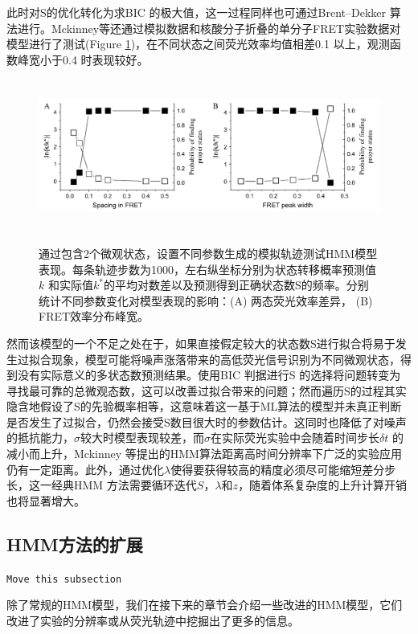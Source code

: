 \documentclass[11pt, a4paper]{article}
\begin{document}
此时对S的优化转化为求BIC 的极大值，这一过程同样也可通过Brent–Dekker 算法进行。Mckinney等还通过模拟数据和核酸分子折叠的单分子FRET实验数据对模型进行了测试(Figure \ref{fig:test})，在不同状态之间荧光效率均值相差0.1 以上，观测函数峰宽小于0.4 时表现较好。

\begin{figure}[htb]
  \centering
  \includegraphics[height=5cm]{Fig_test.PNG}\\
  \caption{通过包含2个微观状态，设置不同参数生成的模拟轨迹测试HMM模型表现。每条轨迹步数为1000，左右纵坐标分别为状态转移概率预测值$k$ 和实际值$k^*$的平均对数差以及预测得到正确状态数S的频率。分别统计不同参数变化对模型表现的影响：(A) 两态荧光效率差异， (B) FRET效率分布峰宽。}%
  \label{fig:test}
\end{figure}

然而该模型的一个不足之处在于，如果直接假定较大的状态数S进行拟合将易于发生过拟合现象，模型可能将噪声涨落带来的高低荧光信号识别为不同微观状态，得到没有实际意义的多状态数预测结果。使用BIC 判据进行S 的选择将问题转变为寻找最可靠的总微观态数，这可以改善过拟合带来的问题；然而遍历S的过程其实隐含地假设了S的先验概率相等，这意味着这一基于ML算法的模型并未真正判断是否发生了过拟合，仍然会接受S数目很大时的参数估计。这同时也降低了对噪声的抵抗能力，$\sigma$较大时模型表现较差，而$\sigma$在实际荧光实验中会随着时间步长$\delta t$ 的减小而上升，Mckinney 等提出的HMM算法距离高时间分辨率下广泛的实验应用仍有一定距离。此外，通过优化$\lambda$使得要获得较高的精度必须尽可能缩短差分步长，这一经典HMM 方法需要循环迭代$S$，$\lambda$和$z$，随着体系复杂度的上升计算开销也将显著增大。


\subsection{HMM方法的扩展}
\textcolor[rgb]{1.00,0.00,0.00}{\texttt{Move this subsection}}

除了常规的HMM模型，我们在接下来的章节会介绍一些改进的HMM模型，它们改进了实验的分辨率或从荧光轨迹中挖掘出了更多的信息。
\end{document}
